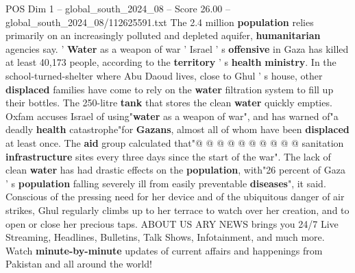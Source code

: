 \begin{textsample}{POS Dim 1 – global\_south\_2024\_08 – Score 26.00 – global\_south\_2024\_08/112625591.txt}
The 2.4 million \textbf{population} relies primarily on an increasingly polluted and depleted aquifer, \textbf{humanitarian} agencies say. ' \textbf{Water} as a weapon of war ' Israel ' s \textbf{offensive} in Gaza has killed at least 40,173 people, according to the \textbf{territory} ' s \textbf{health} \textbf{ministry}.
In the school-turned-shelter where Abu Daoud lives, close to Ghul ' s house, other \textbf{displaced} families have come to rely on the \textbf{water} filtration system to fill up their bottles.
The 250-litre \textbf{tank} that stores the clean \textbf{water} quickly empties.
Oxfam accuses Israel of using"\textbf{water} as a weapon of war", and has warned of"a deadly \textbf{health} catastrophe"for \textbf{Gazans}, almost all of whom have been \textbf{displaced} at least once.
The \textbf{aid} group calculated that"@ @ @ @ @ @ @ @ @ @ sanitation \textbf{infrastructure} sites every three days since the start of the war".
The lack of clean \textbf{water} has had drastic effects on the \textbf{population}, with"26 percent of Gaza ' s \textbf{population} falling severely ill from easily preventable \textbf{diseases}", it said.
Conscious of the pressing need for her device and of the ubiquitous danger of air strikes, Ghul regularly climbs up to her terrace to watch over her creation, and to open or close her precious taps.
ABOUT US ARY NEWS brings you 24/7 Live Streaming, Headlines, Bulletins, Talk Shows, Infotainment, and much more.
Watch \textbf{minute-by-minute} updates of current affairs and happenings from Pakistan and all around the world!

\end{textsample}
